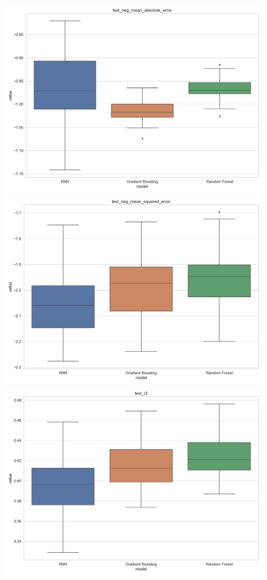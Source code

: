 \documentclass[12pt,a4paper,leqno]{report}
\theoremstyle{plain}
\theoremstyle{definition}
\theoremstyle{remark}
\begin{document}
{
    \centering
    \includegraphics[width=\textwidth,height=\textheight,keepaspectratio]{model_comparison_iphone_test_neg_mean_absolute_error.png}
    \includegraphics[width=\textwidth,height=\textheight,keepaspectratio]{model_comparison_iphone_test_neg_mean_squared_error.png}
    \includegraphics[width=\textwidth,height=\textheight,keepaspectratio]{model_comparison_iphone_test_r2.png}
    \par
}
\end{document}
